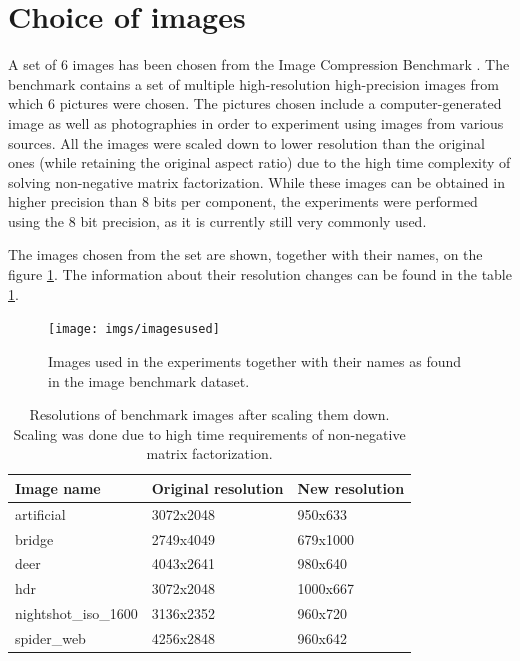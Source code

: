 \documentclass[thesis=M,english]{FITthesis}[2012/10/20]
\begin{document}
\section{Choice of images}
A set of 6 images has been chosen from the Image Compression Benchmark \cite{imgcomprbenchmark}.
The benchmark contains a set of multiple high-resolution high-precision images from which 6
pictures were chosen. The pictures chosen include a computer-generated image as well as photographies
in order to experiment using images from various sources. All the images were scaled down to lower resolution than
the original ones (while retaining the original aspect ratio) due to the high time complexity
of solving non-negative matrix factorization. While these images can be obtained in higher
precision than 8 bits per component, the experiments were performed using the 8 bit precision,
as it is currently still very commonly used.

The images chosen from the set are shown, together with their names, on the
figure \ref{fig:benchmarkimages}. The information about their resolution changes
can be found in the table \ref{tab:benchmarkimagesresolutions}.

\begin{figure}[h]
  \centering
  \texttt{[image: imgs/imagesused]}
  \caption[Benchmark images]{Images used in the experiments together with their names as found in the
           image benchmark dataset.}
  \label{fig:benchmarkimages}
\end{figure}

\begin{table}[h]
\centering
\begin{tabular}{|l|l|l|}
\hline
\textbf{Image name}  & \textbf{Original resolution} & \textbf{New resolution} \\ \hline
artificial           & 3072x2048                    & 950x633                     \\ \hline
bridge               & 2749x4049                    & 679x1000                     \\ \hline
deer                 & 4043x2641                    & 980x640                     \\ \hline
hdr                  & 3072x2048                    & 1000x667                     \\ \hline
nightshot\_iso\_1600 & 3136x2352                    & 960x720                     \\ \hline
spider\_web          & 4256x2848                    & 960x642                     \\ \hline
\end{tabular}
\caption[Resolutions of downscaled benchmark images]{Resolutions of benchmark images after scaling them down. Scaling was done
		due to high time requirements of non-negative matrix factorization.}
\label{tab:benchmarkimagesresolutions}
\end{table}
\end{document}
